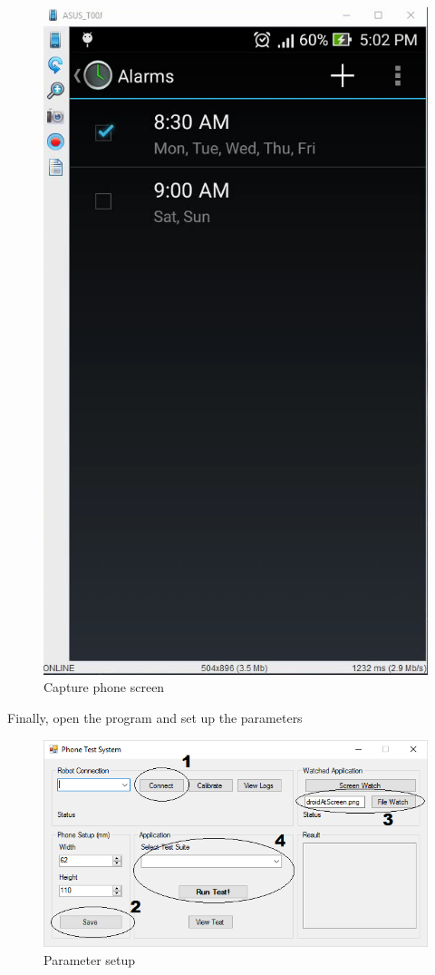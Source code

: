 	\begin{figure}[H]
		\centering
		\includegraphics[scale=0.5]{Chapters/Fig/droidscreen.png}
		\caption{Capture phone screen}
		\label{fig:droidscreen}
	\end{figure}

Finally, open the program and set up the parameters

	\begin{figure}[H]
		\centering
		\includegraphics[scale=0.5]{Chapters/Fig/prog_setup.png}
		\caption{Parameter setup}
		\label{fig:prog_setup}
	\end{figure}

